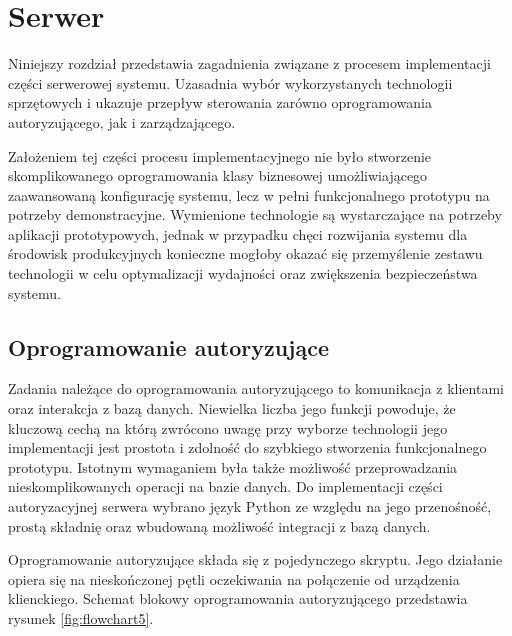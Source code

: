 \chapter{Serwer}
\label{chap:server}

    Niniejszy rozdział przedstawia zagadnienia związane z procesem implementacji części serwerowej systemu. Uzasadnia wybór wykorzystanych technologii sprzętowych i ukazuje przepływ sterowania zarówno oprogramowania autoryzującego, jak i zarządzającego.

    Założeniem tej części procesu implementacyjnego nie było stworzenie skomplikowanego oprogramowania klasy biznesowej umożliwiającego zaawansowaną konfigurację systemu, lecz w pełni funkcjonalnego prototypu na potrzeby demonstracyjne. Wymienione technologie są wystarczające na potrzeby aplikacji prototypowych, jednak w przypadku chęci rozwijania systemu dla środowisk produkcyjnych konieczne mogłoby okazać się przemyślenie zestawu technologii w celu optymalizacji wydajności oraz zwiększenia bezpieczeństwa systemu.

    \section{Oprogramowanie autoryzujące}
    \label{s:auth_subs}

    	Zadania należące do oprogramowania autoryzującego to komunikacja z klientami oraz interakcja z bazą danych. Niewielka liczba jego funkcji powoduje, że kluczową cechą na którą zwrócono uwagę przy wyborze technologii jego implementacji jest prostota i zdolność do szybkiego stworzenia funkcjonalnego prototypu. Istotnym wymaganiem była także możliwość przeprowadzania nieskomplikowanych operacji na bazie danych.
    	Do implementacji części autoryzacyjnej serwera wybrano język Python ze względu na jego przenośność, prostą składnię oraz wbudowaną możliwość integracji z bazą danych.

    	Oprogramowanie autoryzujące składa się z pojedynczego skryptu. Jego działanie opiera się na nieskończonej pętli oczekiwania na połączenie od urządzenia klienckiego. Schemat blokowy oprogramowania autoryzującego przedstawia rysunek \ref{fig:flowchart5}.

